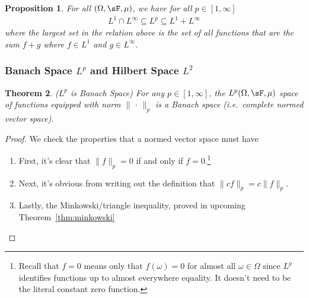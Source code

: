 \documentclass[12pt]{article}
\theoremstyle{plain}
\newtheorem{thm}{Theorem}[section]
\newtheorem{prop}[thm]{Proposition}
\theoremstyle{definition}
\theoremstyle{remark}
\begin{document}
\begin{prop}
For all $(\Omega,\sF,\mu)$, we have for all $p\in[1,\infty]$
\begin{align*}
  L^1 \cap L^\infty \subseteq L^p \subseteq L^1+L^\infty
\end{align*}
where the largest set in the relation above is the set of all functions
that are the sum $f+g$ where $f\in L^1$ and $g\in L^\infty$.
\end{prop}


\clearpage
\subsubsection{Banach Space $L^p$ and Hilbert Space $L^2$}

\begin{thm}\emph{($L^p$ is Banach Space)}
For any $p\in[1,\infty]$, the $L^p(\Omega,\sF,\mu)$ space of functions
equipped with norm $\lVert\,\cdot\,\rVert_p$ is a Banach space (i.e.\
complete normed vector space).
\end{thm}
\begin{proof}
We check the properties that a normed vector space must have
\begin{enumerate}
  \item First, it's clear that $\lVert f\rVert_p=0$ if and only if
    $f=0$.\footnote{%
      Recall that $f=0$ means only that $f(\omega)=0$ for almost all
      $\omega\in\Omega$ since $L^p$ identifies functions up to almost
      everywhere equality. It doesn't need to be the literal constant
      zero function.
    }
  \item Next, it's obvious from writing out the definition that $\lVert
    cf\rVert_p = c\lVert f\rVert_p$.
  \item Lastly, the Minkowski/triangle inequality,
    proved in upcoming Theorem~\ref{thm:minkowski}
\end{enumerate}
\end{proof}
\end{document}
